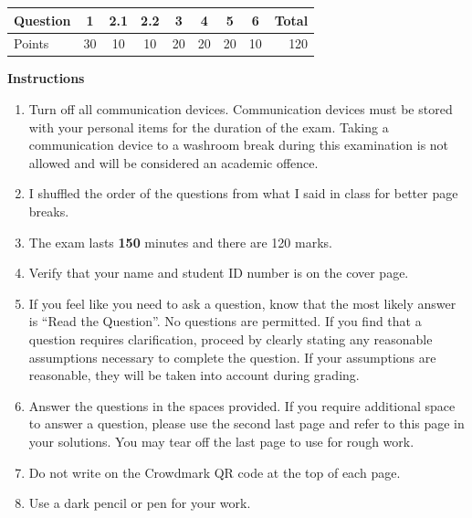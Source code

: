 \documentclass[12pt]{article}
\begin{document}
%
\begin{center}
 \begin{tabular}{|l| c c c c c c c ||r|} \hline
 Question & 1 & 2.1 & 2.2 & 3 & 4 & 5 & 6 &Total \\ \hline
 Points & 30 & 10 & 10 & 20 & 20 & 20 & 10 & 120 \\ \hline
 \end{tabular}
\end{center}
%
\textbf{Instructions}
\begin{enumerate}
   \item Turn off all communication devices. Communication devices must be stored with your personal items for the duration of the exam. Taking a communication device to a washroom break during this examination is not allowed and will be considered an academic offence.
    \item I shuffled the order of the questions from what I said in class for better page breaks.
    \item The exam lasts \textbf{150} minutes and there are 120 marks.
    \item Verify that your name and student ID number is on the cover page.
    \item If you feel like you need to ask a question, know that the most likely answer is ``Read the Question''. No questions are permitted. If you find that a question requires clarification, proceed by clearly stating any reasonable assumptions necessary to complete the question. If your assumptions are reasonable, they will be taken into account during grading. 
\item Answer the questions in the spaces provided.  If you require 
additional space to answer a question, please use the second last page 
and refer to this page in your solutions. You may tear off the last page 
to use for rough work.
\item Do not write on the Crowdmark QR code at the top of each page.
\item Use a dark pencil or pen for your work.
\end{enumerate}
\end{document}
